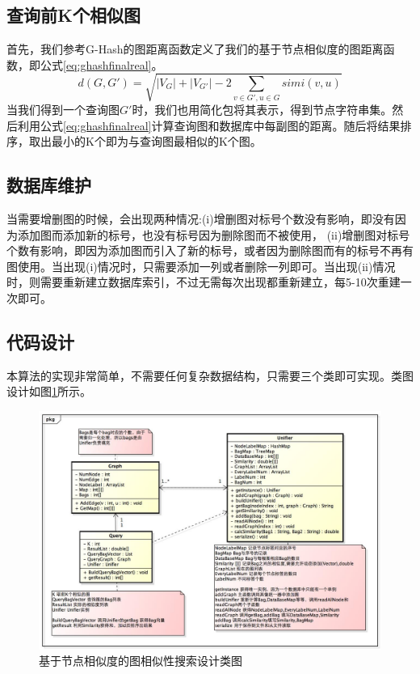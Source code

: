 \documentclass{XDBAthesis}
\begin{document}
\subsection{查询前K个相似图}
首先，我们参考G-Hash的图距离函数定义了我们的基于节点相似度的图距离函数，即公式\eqref{eq:ghashfinalreal}。
\begin{equation}
     d(G,G')=\sqrt{|V_{G}|+|V_{G'}| -2\sum_{v\in G',u\in G}simi(v,u)}
     \label{eq:ghashfinalreal}
\end{equation}
当我们得到一个查询图$G'$时，我们也用简化包将其表示，得到节点字符串集。然后利用公式\eqref{eq:ghashfinalreal}计算查询图和数据库中每副图的距离。随后将结果排序，取出最小的K个即为与查询图最相似的K个图。

\subsection{数据库维护}
当需要增删图的时候，会出现两种情况:(i)增删图对标号个数没有影响，即没有因为添加图而添加新的标号，也没有标号因为删除图而不被使用， (ii)增删图对标号个数有影响，即因为添加图而引入了新的标号，或者因为删除图而有的标号不再有图使用。当出现(i)情况时，只需要添加一列或者删除一列即可。当出现(ii)情况时，则需要重新建立数据库索引，不过无需每次出现都重新建立，每5-10次重建一次即可。
\subsection{代码设计}
本算法的实现非常简单，不需要任何复杂数据结构，只需要三个类即可实现。类图设计如图\ref{fg:ghashdesign}所示。
\begin{figure}
    \includegraphics[width=\textwidth ]{../figures/G-Hash-pkg}
    \caption{基于节点相似度的图相似性搜索设计类图}
    \label{fg:ghashdesign}
\end{figure}
\end{document}
